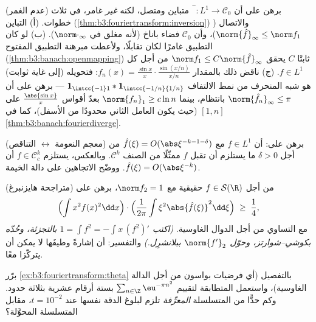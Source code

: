 \begin{exercise}[$\star\star\star$]\label{exo:b3:fouriertransform:6}
(عدم الغمر) برهن على أن $\widehat{\phantom f}\colon L^1
\to \mathcal C_0$ متباين ومتصل، لكنه \emph{غير}
غامر، في ثلاث خطوات.
(أ) التباين (\cref{thm:b3:fouriertransform:inversion}) والاتصال ($\norm{\hat f}_\infty \leq \norm f_1$)، وأن
$\mathcal C_0$ فضاء باناخ (لأنه مغلق في $\norm\cdot_\infty$).
(ب) لو كان التطبيق غامرًا لكان تقابلًا، ولأعطت مبرهنة التطبيق
المفتوح (\cref{thm:b3:banach:openmapping}) ثابتًا $C$ يحقق $\norm f_1 \leq C\norm{\hat
f}_\infty$ من أجل كل
$f \in L^1$.
(ج) ناقض ذلك بالمقدار $f_n(x) = \frac{\sin
x}{x}\cdot\frac{\sin(x/n)}{x/n}$: فتحويله (إلى غاية ثوابت) هو شبه
المنحرف من نمط الالتفاف $\mathbf 1_{\intcc{-1}1} *
\mathbf 1_{\intcc{-1/n}{1/n}}$ --- برهن على أن $\norm{\hat f_n}_\infty \leq \pi$
بانتظام، بينما $\norm{f_n}_1 \geq c\ln n$ بعدّ أقواس $\frac{\abs{\sin x}}x$ على $[1, n]$ (حيث
يكون العامل الثاني محدودًا من الأسفل)، كما في \cref{thm:b3:banach:fourierdiverge}.
\end{exercise}

\begin{exercise}[$\star\star$]\label{exo:b3:fouriertransform:7}
(معجم النعومة $\leftrightarrow$ التناقص) برهن على: أن $f \in
L^1$ مع $\hat f(\xi) = O(\abs\xi^{-k-1-\delta})$
من أجل $\delta > 0$ ما يستلزم أن تقبل $f$ ممثّلًا من الصنف
$\mathcal C^k$. وبالعكس، يستلزم $f \in \mathcal C^k_c$ أن $\hat f(\xi) =
O(\abs\xi^{-k})$. ووضّح
الاتجاهين على دالة الخيمة.
\end{exercise}

\begin{exercise}[$\star\star\star$]\label{exo:b3:fouriertransform:8}
(متراجحة هايزنبرغ) من أجل $f \in \mathcal S(\R)$ حقيقية مع $\norm f_2 = 1$،
برهن على
\[
\Bigl(\int x^2f(x)^2\dd x\Bigr)\cdot
\Bigl(\frac1{2\pi}\int \xi^2\abs{\hat f(\xi)}^2\dd\xi\Bigr)
\;\geq\; \frac14 ,
\]
مع التساوي من أجل الدوال الغاوسية. \emph{(اكتب $1 = \int f^2 =
-\int x\,(f^2)'$
بالتجزئة، وحُدّه بكوشي--شوارتز، وحوّل $\norm{f'}_2$
ببلانشرِل.)} والتفسير: أن إشارةً وطيفَها لا يمكن أن يتركّزا
معًا.
\end{exercise}

\begin{exercise}[$\star\star$]\label{exo:b3:fouriertransform:9}
برّر \cref{ex:b3:fouriertransform:theta} بالتفصيل (أي فرضيات بواسون من أجل الدالة
الغاوسية)، واستعمل المتطابقة لتقييم $\sum_{n\in\Z}\eu^{-\pi n^2}$ بستة أرقام عشرية
بثلاثة حدود. وكم حدًّا من المتسلسلة \emph{المعرِّفة} تلزم لبلوغ
الدقة نفسها عند $t = 10^{-2}$، مقابل المتسلسلة المحوَّلة؟
\end{exercise}

